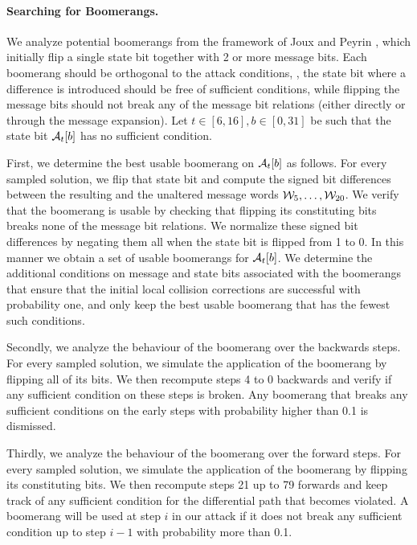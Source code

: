 \paragraph{Searching for Boomerangs.}
We analyze potential boomerangs from the framework of Joux and Peyrin \cite{DBLP:conf/crypto/JouxP07}, which initially flip a single state bit together with 2 or more message bits.
Each boomerang should be orthogonal to the attack conditions, \ie, the state bit where a difference is introduced
should be free of sufficient conditions, while flipping the message bits should not break any of the message bit relations
(either directly or through the message expansion).
Let $t\in[6,16], b\in[0,31]$ be such that the state bit $\mathcal{A}_t[b]$ has no sufficient condition.

First, we determine the best usable boomerang on $\mathcal{A}_t[b]$ as follows.
For every sampled solution, we flip that state bit and compute the signed bit differences between the resulting and the unaltered message words $\mathcal{W}_5,\ldots,\mathcal{W}_{20}$.
We verify that the boomerang is usable by checking that flipping its constituting bits breaks none of the message bit relations.
We normalize these signed bit differences by negating them all when the state bit is flipped from 1 to 0.
In this manner we obtain a set of usable boomerangs for $\mathcal{A}_t[b]$.
We determine the additional conditions on message and state bits associated with the boomerangs that ensure that the initial local collision corrections are successful with probability one,
and only keep the best usable boomerang that has the fewest such conditions.

Secondly, we analyze the behaviour of the boomerang over the backwards steps.
For every sampled solution, we simulate the application of the boomerang by flipping all of its bits.
We then recompute steps 4 to 0 backwards and verify if any sufficient condition on these steps is broken.
Any boomerang that breaks any sufficient conditions on the early steps with probability higher than 0.1 is dismissed.

Thirdly, we analyze the behaviour of the boomerang over the forward steps.
For every sampled solution, we simulate the application of the boomerang by flipping its constituting bits.
We then recompute steps 21 up to 79 forwards and keep track of any sufficient condition for the differential path that becomes violated.
A boomerang will be used at step $i$ in our attack if it does not break any sufficient condition up to step $i-1$ with probability more than 0.1.

